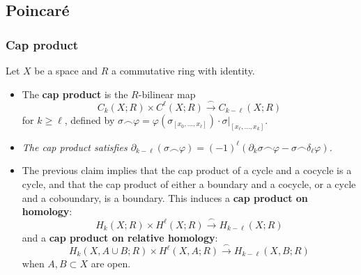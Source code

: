 \documentclass[10pt]{article}
\begin{document}

        \subsection{Poincaré}

            \subsubsection{Cap product}

                Let $X$ be a space and $R$ a commutative ring with identity.

                \begin{itemize}
                    \item The \textbf{cap product} is the $R$-bilinear map
                        \begin{equation*}
                            C_k(X;R)\times C^\ell(X;R)\xrightarrow{\smallfrown}C_{k-\ell}(X;R)
                        \end{equation*}
                        for $k\geqslant\ell$, defined by $\sigma\smallfrown\varphi=\varphi(\sigma_{[x_0,\ldots,x_\ell]})\cdot\sigma|_{[x_\ell,\ldots, x_k]}$.
                    \item \emph{The cap product satisfies $\partial_{k-\ell}(\sigma\smallfrown\varphi)=(-1)^\ell(\partial_k\sigma\smallfrown\varphi-\sigma\smallfrown\delta_\ell\varphi)$.}
                    \item The previous claim implies that the cap product of a cycle and a cocycle is a cycle, and that the cap product of either a boundary and a cocycle, or a cycle and a coboundary, is a boundary.
                        This induces a \textbf{cap product on homology}:
                        \begin{equation*}
                            H_k(X;R)\times H^\ell(X;R)\xrightarrow{\smallfrown}H_{k-\ell}(X;R)
                        \end{equation*}
                        and a \textbf{cap product on relative homology}:
                        \begin{equation*}
                            H_k(X,A\cup B;R)\times H^\ell(X,A;R)\xrightarrow{\smallfrown}H_{k-\ell}(X,B;R)
                        \end{equation*}
                        when $A,B\subset X$ are open.
                \end{itemize}
\end{document}
